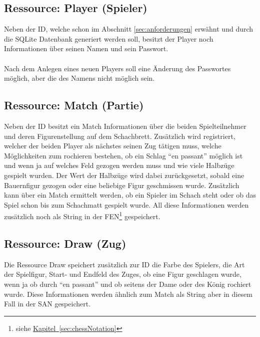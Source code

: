 \subsection{Ressource: Player (Spieler)}\label{sec:resplayer}
Neben der ID, welche schon im Abschnitt \ref{sec:anforderungen} erwähnt und durch die SQLite Datenbank generiert werden soll, besitzt der Player noch Informationen über seinen Namen und sein Passwort.\\
\\
Nach dem Anlegen eines neuen Players soll eine Änderung des Passwortes möglich, aber die des Namens nicht möglich sein.

\subsection{Ressource: Match (Partie)}\label{sec:resmatch}
Neben der ID besitzt ein Match Informationen über die beiden Spielteilnehmer und deren Figurenstellung auf dem Schachbrett. Zusätzlich wird registriert, welcher der beiden Player als nächstes seinen Zug tätigen muss, welche Möglichkeiten zum rochieren bestehen, ob ein Schlag \enquote{en passant} möglich ist und wenn ja auf welches Feld gezogen werden muss und wie viele Halbzüge gespielt wurden. Der Wert der Halbzüge wird dabei zurückgesetzt, sobald eine Bauernfigur gezogen oder eine beliebige Figur geschmissen wurde. Zusätzlich kann über ein Match ermittelt werden, ob ein Spieler im Schach steht oder ob das Spiel schon bis zum Schachmatt gespielt wurde. All diese Informationen werden zusätzlich noch als String in der \gls{FEN}\footnote{\label{foot:chapter}siehe \hyperref[sec:chessNotation]{Kapitel~\ref{sec:chessNotation}}} gespeichert.

\subsection{Ressource: Draw (Zug)}\label{sec:resdraw}
Die Ressource Draw speichert zusätzlich zur ID die Farbe des Spielers, die Art der Spielfigur, Start- und Endfeld des Zuges, ob eine Figur geschlagen wurde, wenn ja ob durch \enquote{en passant} und ob seitens der Dame oder des König rochiert wurde. Diese Informationen werden ähnlich zum Match als String aber in diesem Fall in der \gls{SAN} gespeichert.

